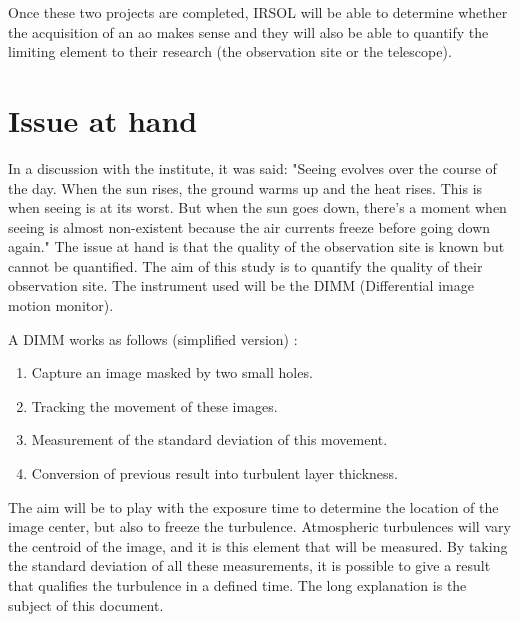 Once these two projects are completed, \Gls{IRSOL} will be able to determine whether the acquisition of an \acrfull{ao} makes sense
and they will also be able to quantify the limiting element to their research (the observation site or the telescope).



\section{Issue at hand}
In a discussion with the institute, it was said: "Seeing evolves over the course of the day.
When the sun rises, the ground warms up and the heat rises. This is when seeing is at its worst.
But when the sun goes down, there's a moment when seeing is almost non-existent because the air currents freeze before going down again."
\bigbreak
The issue at hand is that the quality of the observation site is known but cannot be quantified.
The aim of this study is to quantify the quality of their observation site.
The instrument used will be the \Gls{DIMM} (Differential image motion monitor).

A \Gls{DIMM} works as follows (simplified version) :
\begin{enumerate}
    \item Capture an image masked by two small holes.
    \item Tracking the movement of these images.
    \item Measurement of the standard deviation of this movement.
    \item Conversion of previous result into turbulent layer thickness.
\end{enumerate}
The aim will be to play with the exposure time to determine the location of the image center, but also to freeze the turbulence.
\newline
Atmospheric turbulences will vary the centroid of the image, and it is this element that will be measured.
By taking the standard deviation of all these measurements, it is possible to give a result that qualifies the turbulence in a defined time.
\newline
The long explanation is the subject of this document.

